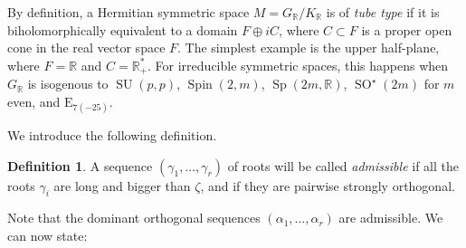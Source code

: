 \documentclass[10pt]{amsart}
\theoremstyle{plain}
\theoremstyle{definition}
\newtheorem{defi}[theo]{Definition}
\DeclareMathOperator{\SO}{SO}
\DeclareMathOperator{\SU}{SU}
\DeclareMathOperator{\Sp}{Sp}
\DeclareMathOperator{\Spin}{Spin}
\newcommand{\bR}{\mathbb{R}}
\begin{document}
By definition, a Hermitian symmetric space $M=G_\bR/K_\bR$ is of \emph{tube type} if it is biholomorphically equivalent to a domain $F\oplus i C$, where
$C \subset F$ is a proper open cone in the real vector space $F$. The simplest example is the upper
half-plane, where $F=\bR$ and $C=\bR_+^*$. For irreducible symmetric spaces,
this happens when $G_\bR$ is isogenous to $\SU(p,p)$, $\Spin(2,m)$, $\Sp(2m,\bR)$,
$\SO^\star(2m)$ for $m$ even, and $\mathrm{E}_{7(-25)}$.

We introduce the following definition.

\begin{defi}
\label{defi:admissible-sequence}
A sequence $(\gamma_1,\ldots,\gamma_r)$ of roots will be called \emph{admissible} if all the roots $\gamma_i$ are long
and bigger than $\zeta$, and if they are pairwise strongly orthogonal.
\end{defi}

Note that the dominant orthogonal sequences $(\alpha_1,\ldots,\alpha_r)$ are admissible.
We can now state:
\end{document}
